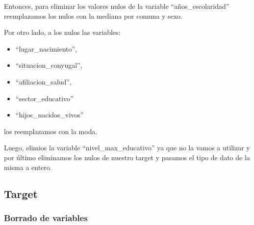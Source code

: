 \documentclass[a4paper]{article}
\begin{document}
        Entonces, para eliminar los valores nulos de la variable ``años\_escolaridad'' reemplazamos los nulos con la mediana por comuna y sexo.

        Por otro lado, a los nulos las variables:
        \begin{itemize}
            \item ``lugar\_nacimiento'',
            \item ``situacion\_conyugal'',
            \item ``afiliacion\_salud'',
            \item ``sector\_educativo''
            \item ``hijos\_nacidos\_vivos''
        \end{itemize}
        los reemplazamos con la moda.
        
        Luego, elimios la variable ``nivel\_max\_educativo'' ya que no la vamos a utilizar y por último eliminamos los nulos de nuestro target y pasamos el tipo de dato de la misma a entero. 
        

    \subsection{Target}

        \subsubsection{Borrado de variables}
    
\end{document}
